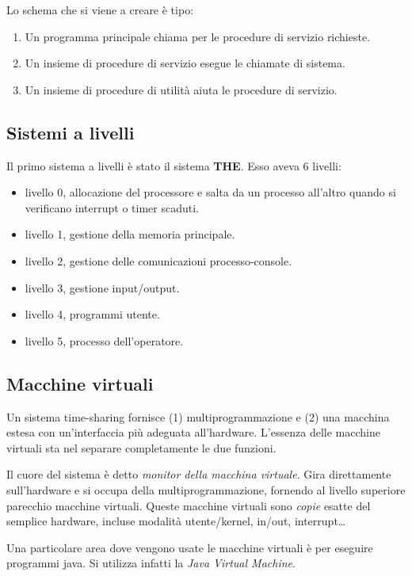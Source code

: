 Lo schema che si viene a creare è tipo:

\begin{enumerate}
  \item Un programma principale chiama per le procedure di servizio richieste.
  \item Un insieme di procedure di servizio esegue le chiamate di sistema.
  \item Un insieme di procedure di utilità aiuta le procedure di servizio.  
\end{enumerate}

\subsection{Sistemi a livelli}

Il primo sistema a livelli è stato il sistema \textbf{THE}.
Esso aveva 6 livelli:
\begin{itemize}
  \item livello 0, allocazione del processore e salta da un processo all'altro quando si verificano interrupt o timer scaduti.
  \item livello 1, gestione della memoria principale.
  \item livello 2, gestione delle comunicazioni processo-console.
  \item livello 3, gestione input/output.
  \item livello 4, programmi utente.
  \item livello 5, processo dell'operatore.
\end{itemize}

\subsection{Macchine virtuali}

Un sistema time-sharing fornisce (1) multiprogrammazione e (2) una macchina estesa con un'interfaccia più adeguata all'hardware.
L'essenza delle macchine virtuali sta nel separare completamente le due funzioni.

Il cuore del sistema è detto \textit{monitor della macchina virtuale}. Gira direttamente sull'hardware e si occupa della multiprogrammazione, fornendo al livello superiore parecchio macchine virtuali. Queste macchine virtuali sono \textit{copie} esatte del semplice hardware, incluse modalità utente/kernel, in/out, interrupt\dots

Una particolare area dove vengono usate le macchine virtuali è per eseguire programmi java. Si utilizza infatti la \textit{Java Virtual Machine}.

